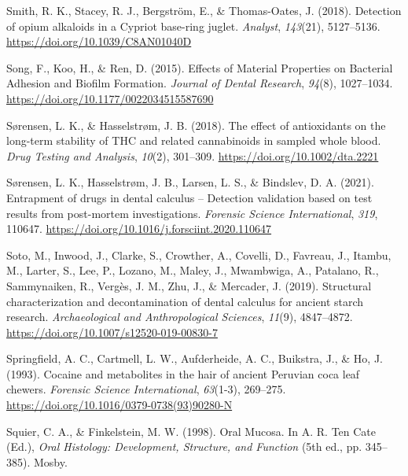 \documentclass[
  letterpaper,
]{book}
\newlength{\cslhangindent}
\newlength{\cslentryspacingunit} %
\newenvironment{CSLReferences}[2] %
 {%
  \setlength{\parindent}{0pt}
  \ifodd #1
  \let\oldpar\par
  \def\par{\hangindent=\cslhangindent\oldpar}
  \fi
  \setlength{\parskip}{#2\cslentryspacingunit}
 }%
 {}
\begin{document}
\begin{CSLReferences}{1}{0}
\leavevmode{}%
Smith, R. K., Stacey, R. J., Bergström, E., \& Thomas-Oates, J. (2018).
Detection of opium alkaloids in a {Cypriot} base-ring juglet.
\emph{Analyst}, \emph{143}(21), 5127--5136.
\url{https://doi.org/10.1039/C8AN01040D}

\leavevmode{}%
Song, F., Koo, H., \& Ren, D. (2015). Effects of {Material Properties}
on {Bacterial Adhesion} and {Biofilm Formation}. \emph{Journal of Dental
Research}, \emph{94}(8), 1027--1034.
\url{https://doi.org/10.1177/0022034515587690}

\leavevmode{}%
Sørensen, L. K., \& Hasselstrøm, J. B. (2018). The effect of
antioxidants on the long-term stability of {THC} and related
cannabinoids in sampled whole blood. \emph{Drug Testing and Analysis},
\emph{10}(2), 301--309. \url{https://doi.org/10.1002/dta.2221}

\leavevmode{}%
Sørensen, L. K., Hasselstrøm, J. B., Larsen, L. S., \& Bindslev, D. A.
(2021). Entrapment of drugs in dental calculus -- {Detection} validation
based on test results from post-mortem investigations. \emph{Forensic
Science International}, \emph{319}, 110647.
\url{https://doi.org/10.1016/j.forsciint.2020.110647}

\leavevmode{}%
Soto, M., Inwood, J., Clarke, S., Crowther, A., Covelli, D., Favreau,
J., Itambu, M., Larter, S., Lee, P., Lozano, M., Maley, J., Mwambwiga,
A., Patalano, R., Sammynaiken, R., Vergès, J. M., Zhu, J., \& Mercader,
J. (2019). Structural characterization and decontamination of dental
calculus for ancient starch research. \emph{Archaeological and
Anthropological Sciences}, \emph{11}(9), 4847--4872.
\url{https://doi.org/10.1007/s12520-019-00830-7}

\leavevmode{}%
Springfield, A. C., Cartmell, L. W., Aufderheide, A. C., Buikstra, J.,
\& Ho, J. (1993). Cocaine and metabolites in the hair of ancient
{Peruvian} coca leaf chewers. \emph{Forensic Science International},
\emph{63}(1-3), 269--275.
\url{https://doi.org/10.1016/0379-0738(93)90280-N}

\leavevmode{}%
Squier, C. A., \& Finkelstein, M. W. (1998). Oral {Mucosa}. In A. R. Ten
Cate (Ed.), \emph{Oral {Histology}: {Development}, {Structure}, and
{Function}} (5th ed., pp. 345--385). {Mosby}.


\end{CSLReferences}
\end{document}
